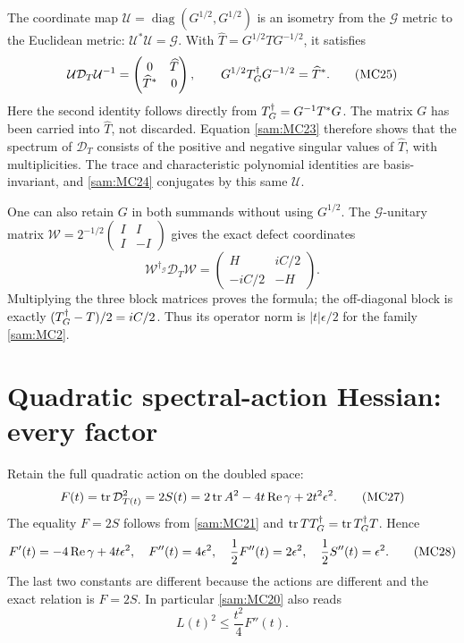 The coordinate map \(\mathcal U=\operatorname{diag}(G^{1/2},G^{1/2})\)
is an isometry from the \(\mathcal G\) metric to the Euclidean metric:
\(\mathcal U^*\mathcal U=\mathcal G\). With
\(\widehat T=G^{1/2}TG^{-1/2}\), it satisfies
\begin{equation}
 \mathcal U\mathcal D_T\mathcal U^{-1}
  =\begin{pmatrix}0&\widehat T\\\widehat T^*&0\end{pmatrix},
 \qquad
 G^{1/2}T^\dagger_G G^{-1/2}=\widehat T^*.
 \tag{MC25}\label{sam:MC25}
\end{equation}
Here the second identity follows directly from \(T^\dagger_G=G^{-1}T^*G\).
The matrix \(G\) has been carried into \(\widehat T\), not discarded.
Equation \eqref{sam:MC23} therefore shows that the spectrum of
\(\mathcal D_T\) consists of the positive and negative singular values
of \(\widehat T\), with multiplicities. The trace and characteristic
polynomial identities are basis-invariant, and \eqref{sam:MC24} conjugates
by this same \(\mathcal U\).

One can also retain \(G\) in both summands without using \(G^{1/2}\).
The \(\mathcal G\)-unitary matrix
\(\mathcal W=2^{-1/2}\left(\begin{smallmatrix}I&I\\I&-I\end{smallmatrix}\right)\)
gives the exact defect coordinates
\begin{equation}
 \mathcal W^{\dagger_{\mathcal G}}\mathcal D_T\mathcal W
 =\begin{pmatrix}H&iC/2\\-iC/2&-H\end{pmatrix}.
 \tag{MC26}\label{sam:MC26}
\end{equation}
Multiplying the three block matrices proves the formula; the
off-diagonal block is exactly \((T^\dagger_G-T)/2=iC/2\).
Thus its operator norm is \(|t|\epsilon/2\) for the family \eqref{sam:MC2}.

\section{Quadratic spectral-action Hessian: every factor}

Retain the full quadratic action on the doubled space:
\begin{equation}
 F(t)=\operatorname{tr}\mathcal D_{T(t)}^2
      =2S(t)
      =2\operatorname{tr} A^2-4t\operatorname{Re}\gamma+2t^2\epsilon^2.
 \tag{MC27}\label{sam:MC27}
\end{equation}
The equality \(F=2S\) follows from \eqref{sam:MC21} and
\(\operatorname{tr} TT^\dagger_G=\operatorname{tr} T^\dagger_G T\). Hence
\begin{equation}
 F'(t)=-4\operatorname{Re}\gamma+4t\epsilon^2,\quad
 F''(t)=4\epsilon^2,\quad
 \frac12F''(t)=2\epsilon^2,\quad
 \frac12S''(t)=\epsilon^2.
 \tag{MC28}\label{sam:MC28}
\end{equation}
The last two constants are different because the actions are different
and the exact relation is \(F=2S\). In particular \eqref{sam:MC20} also reads
\begin{equation}
 L(t)^2\le\frac{t^2}{4}F''(t).
 \tag{MC29}\label{sam:MC29}
\end{equation}

